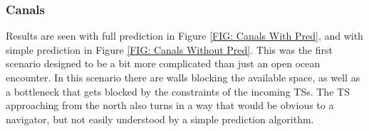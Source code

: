 \subsubsection{Canals}
Results are seen with full prediction in Figure \ref{FIG: Canals With Pred}, and with simple prediction in Figure \ref{FIG: Canals Without Pred}.
This was the first scenario designed to be a bit more complicated than just an open ocean encounter. In this scenario there are
walls blocking the available space, as well as a bottleneck that gets blocked by the constraints of the incoming TSs. The TS approaching from the
north also turns in a way that would be obvious to a navigator, but not easily understood by a simple prediction algorithm.


